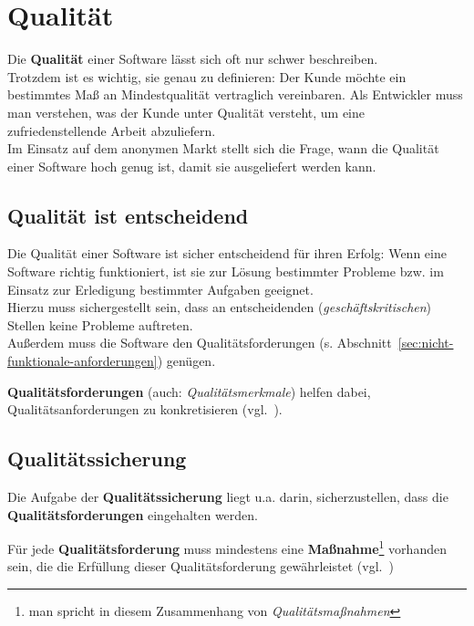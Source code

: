 \section{Qualität}\label{sec:qualitat}
Die \textbf{Qualität} einer Software lässt sich oft nur schwer beschreiben.\\
Trotzdem ist es wichtig, sie genau zu definieren: Der Kunde möchte ein bestimmtes Maß an Mindestqualität vertraglich vereinbaren.
Als Entwickler muss man verstehen, was der Kunde unter Qualität versteht, um eine zufriedenstellende Arbeit abzuliefern.\\
Im Einsatz auf dem anonymen Markt stellt sich die Frage, wann die Qualität einer Software hoch genug ist, damit sie ausgeliefert werden kann.

\subsection*{Qualität ist entscheidend}
Die Qualität einer Software ist sicher entscheidend für ihren Erfolg: Wenn eine Software richtig funktioniert, ist sie zur Lösung bestimmter Probleme bzw. im Einsatz zur Erledigung bestimmter Aufgaben geeignet.\\
Hierzu muss sichergestellt sein, dass an entscheidenden (\textit{geschäftskritischen}) Stellen keine Probleme auftreten.\\
Außerdem muss die Software den Qualitätsforderungen (s. Abschnitt~\ref{sec:nicht-funktionale-anforderungen}) genügen.

\vspace{2mm}
\begin{tcolorbox}[title=Qualitätsforderung/Qualitätsanforderung]
    \textbf{Qualitätsforderungen} (auch: \textit{Qualitätsmerkmale}) helfen dabei, Qualitätsanforderungen zu konkretisieren (vgl.~\cite[58]{Wed09}).
\end{tcolorbox}

\subsection*{Qualitätssicherung}
Die Aufgabe der \textbf{Qualitätssicherung} liegt u.a. darin, sicherzustellen, dass die \textbf{Qualitätsforderungen} eingehalten werden.

\vspace{2mm}
\begin{tcolorbox}
    Für jede \textbf{Qualitätsforderung} muss mindestens eine \textbf{Maßnahme}\footnote{man spricht in diesem Zusammenhang von \textit{Qualitätsmaßnahmen}} vorhanden sein, die die Erfüllung dieser Qualitätsforderung gewährleistet (vgl.~\cite[1]{Wed09c})
\end{tcolorbox}
\vspace{2mm}

